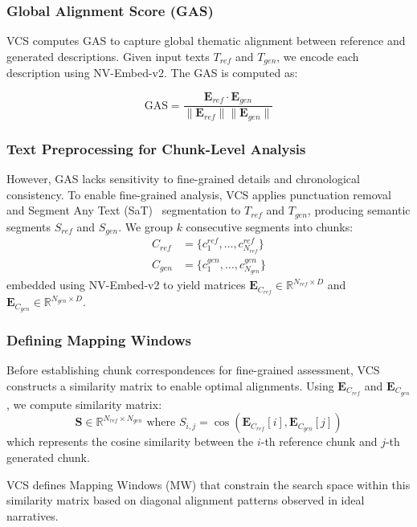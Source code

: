 \documentclass[main.tex]{subfiles}
\begin{document}
\subsubsection{Global Alignment Score (GAS)}
VCS computes GAS to capture global thematic alignment between reference and generated descriptions. Given input texts $T_{ref}$ and $T_{gen}$, we encode each description using NV-Embed-v2. The GAS is computed as:

\begin{equation} \label{eq:gas_revised}
\text{GAS} = \frac{\mathbf{E}_{ref} \cdot \mathbf{E}_{gen}}{\|\mathbf{E}_{ref}\| \|\mathbf{E}_{gen}\|}
\end{equation}

\subsubsection{Text Preprocessing for Chunk-Level Analysis}
However, GAS lacks sensitivity to fine-grained details and chronological consistency. To enable fine-grained analysis, VCS applies punctuation removal and Segment Any Text (SaT)~\cite{frohmann-etal-2024-segment} segmentation to $T_{ref}$ and $T_{gen}$, producing semantic segments $S_{ref}$ and $S_{gen}$. We group $k$ consecutive segments into chunks:
\begin{align}
C_{ref} &= \{c_1^{ref}, \ldots, c_{N_{ref}}^{ref}\} \\
C_{gen} &= \{c_1^{gen}, \ldots, c_{N_{gen}}^{gen}\}
\end{align}
embedded using NV-Embed-v2 to yield matrices $\mathbf{E}_{C_{ref}} \in \mathbb{R}^{N_{ref} \times D}$ and $\mathbf{E}_{C_{gen}} \in \mathbb{R}^{N_{gen} \times D}$.

\subsubsection{Defining Mapping Windows}
Before establishing chunk correspondences for fine-grained assessment, VCS constructs a similarity matrix to enable optimal alignments. Using $\mathbf{E}_{C_{ref}}$ and $\mathbf{E}_{C_{gen}}$, we compute similarity matrix:
\begin{equation}
\mathbf{S} \in \mathbb{R}^{N_{ref} \times N_{gen}} \text{ where } S_{i,j} = \cos(\mathbf{E}_{C_{ref}}[i], \mathbf{E}_{C_{gen}}[j])
\end{equation}
which represents the cosine similarity between the $i$-th reference chunk and $j$-th generated chunk.

VCS defines Mapping Windows (MW) that constrain the search space within this similarity matrix based on diagonal alignment patterns observed in ideal narratives.
\end{document}
